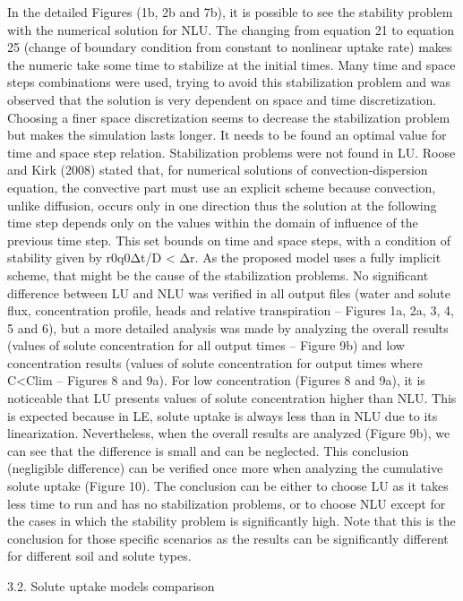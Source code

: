 In the detailed Figures (1b, 2b and 7b), it is possible to see the stability problem with the numerical solution for NLU. The changing from equation 21 to equation 25 (change of boundary condition from constant to nonlinear uptake rate) makes the numeric take some time to stabilize at the initial times. Many time and space steps combinations were used, trying to avoid this stabilization problem and was observed that the solution is very dependent on space and time discretization. Choosing a finer space discretization seems to decrease the stabilization problem but makes the simulation lasts longer. It needs to be found an optimal value for time and space step relation. Stabilization problems were not found in LU.
Roose and Kirk (2008) stated that, for numerical solutions of convection-dispersion equation, the convective part must use an explicit scheme because convection, unlike diffusion, occurs only in one direction thus the solution at the following time step depends only on the values within the domain of influence of the previous time step. This set bounds on time and space steps, with a condition of stability given by r0q0Δt/D < Δr. As the proposed model uses a fully implicit scheme, that might be the cause of the stabilization problems.
No significant difference between LU and NLU was verified in all output files (water and solute flux, concentration profile, heads and relative transpiration – Figures 1a, 2a, 3, 4, 5 and 6), but a more detailed analysis was made by analyzing the overall results (values of solute concentration for all output times – Figure 9b) and low concentration results (values of solute concentration for output times where C<Clim – Figures 8 and 9a).
For low concentration (Figures 8 and 9a), it is noticeable that LU presents values of solute concentration higher than NLU. This is expected because in LE, solute uptake is always less than in NLU due to its linearization. Nevertheless, when the overall results are analyzed (Figure 9b), we can see that the difference is small and can be neglected. This conclusion (negligible difference) can be verified once more when analyzing the cumulative solute uptake (Figure 10). 
The conclusion can be either to choose LU as it takes less time to run and has no stabilization problems, or to choose NLU except for the cases in which the stability problem is significantly high. Note that this is the conclusion for those specific scenarios as the results can be significantly different for different soil and solute types.

3.2. Solute uptake models comparison

